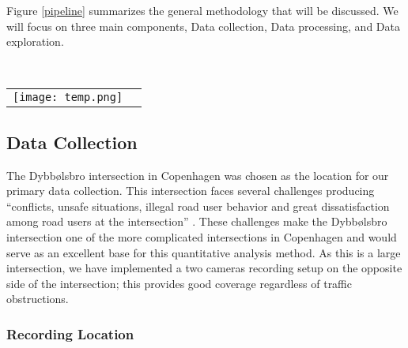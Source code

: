 
Figure \ref{pipeline} summarizes the general methodology that will be discussed. We will focus
on three main components, Data collection, Data processing, and Data exploration.

\ \\ 
\noindent
\begin{tabular}{@{}cc}
\texttt{[image: temp.png]} 
\end{tabular}
\label{pipeline}

\subsection{Data Collection}

The Dybbølsbro intersection in Copenhagen was chosen as the location for our primary data collection. 
This intersection faces several challenges producing “conflicts, unsafe situations, illegal road user behavior and great dissatisfaction among road users at the intersection” \cite{CPHpost_2021}.
These challenges make the Dybbølsbro intersection one of the more complicated intersections in Copenhagen and would serve as an excellent base for this quantitative analysis method. 
As this is a large intersection, we have implemented a two cameras recording setup on the opposite side of the intersection; this provides good coverage regardless of traffic obstructions.
\subsubsection{Recording Location}

